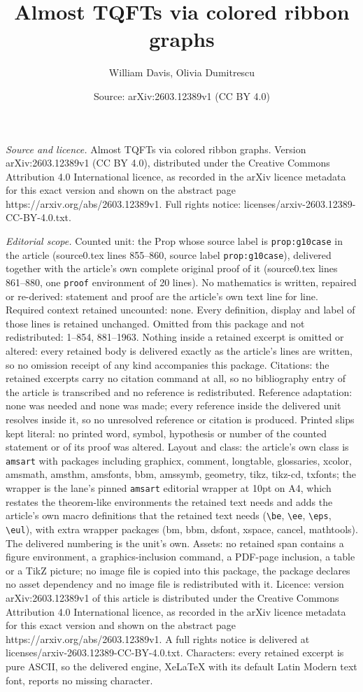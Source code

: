 \documentclass[10pt,a4paper]{amsart}
\title[Almost TQFTs via colored ribbon graphs]{Almost TQFTs via colored ribbon graphs}
\author{William Davis, Olivia Dumitrescu}
\date{Source: arXiv:2603.12389v1 (CC BY 4.0)}
\begin{document}
\maketitle

\noindent\emph{Source and licence.} Almost TQFTs via colored ribbon graphs. Version arXiv:2603.12389v1 (CC BY 4.0), distributed under the Creative Commons Attribution 4.0 International licence, as recorded in the arXiv licence metadata for this exact version and shown on the abstract page https://arxiv.org/abs/2603.12389v1. Full rights notice: licenses/arxiv-2603.12389-CC-BY-4.0.txt.\par\smallskip

\noindent\textit{Editorial scope.} Counted unit: the Prop whose source label is \texttt{prop:g10case} in the article (source0.tex lines 855--860, source label \texttt{prop:g10case}), delivered together with the article's own complete original proof of it (source0.tex lines 861--880, one \texttt{proof} environment of 20 lines). No mathematics is written, repaired or re-derived: statement and proof are the article's own text line for line. Required context retained uncounted: none. Every definition, display and label of those lines is retained unchanged. Omitted from this package and not redistributed: 1--854, 881--1963. Nothing inside a retained excerpt is omitted or altered: every retained body is delivered exactly as the article's lines are written, so no omission receipt of any kind accompanies this package. Citations: the retained excerpts carry no citation command at all, so no bibliography entry of the article is transcribed and no reference is redistributed. Reference adaptation: none was needed and none was made; every reference inside the delivered unit resolves inside it, so no unresolved reference or citation is produced. Printed slips kept literal: no printed word, symbol, hypothesis or number of the counted statement or of its proof was altered. Layout and class: the article's own class is \texttt{amsart} with packages including graphicx, comment, longtable, glossaries, xcolor, amsmath, amsthm, amsfonts, bbm, amssymb, geometry, tikz, tikz-cd, txfonts; the wrapper is the lane's pinned \texttt{amsart} editorial wrapper at 10pt on A4, which restates the theorem-like environments the retained text needs and adds the article's own macro definitions that the retained text needs (\texttt{\textbackslash be}, \texttt{\textbackslash ee}, \texttt{\textbackslash eps}, \texttt{\textbackslash eul}), with extra wrapper packages (bm, bbm, dsfont, xspace, cancel, mathtools). The delivered numbering is the unit's own. Assets: no retained span contains a figure environment, a graphics-inclusion command, a PDF-page inclusion, a table or a TikZ picture; no image file is copied into this package, the package declares no asset dependency and no image file is redistributed with it. Licence: version arXiv:2603.12389v1 of this article is distributed under the Creative Commons Attribution 4.0 International licence, as recorded in the arXiv licence metadata for this exact version and shown on the abstract page https://arxiv.org/abs/2603.12389v1. A full rights notice is delivered at licenses/arxiv-2603.12389-CC-BY-4.0.txt. Characters: every retained excerpt is pure ASCII, so the delivered engine, XeLaTeX with its default Latin Modern text font, reports no missing character.
\end{document}
